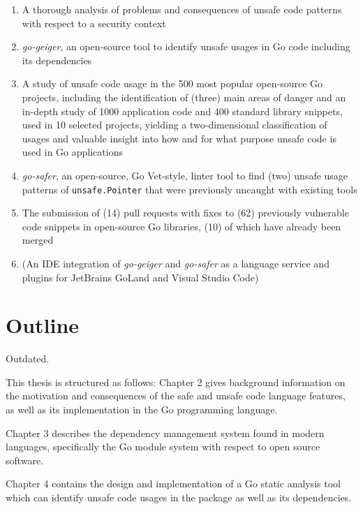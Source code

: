 \begin{enumerate}
    \item A thorough analysis of problems and consequences of unsafe code patterns with respect to a security context
    \item \textit{go-geiger}, an open-source tool to identify unsafe usages in Go code including its dependencies
    \item A study of unsafe code usage in the 500 most popular open-source Go projects, including the identification
    of (three) main areas of danger and an in-depth study of 1000 application code and 400 standard library snippets,
    used in 10 selected projects, yielding a two-dimensional classification of usages and valuable insight into how and
    for what purpose unsafe code is used in Go applications
    \item \textit{go-safer}, an open-source, Go Vet-style, linter tool to find (two) unsafe usage patterns of \texttt{unsafe.Pointer}
    that were previously uncaught with existing tools
    \item The submission of (14) pull requests with fixes to (62) previously vulnerable code snippets in open-source Go
    libraries, (10) of which have already been merged
    \item (An IDE integration of \textit{go-geiger} and \textit{go-safer} as a language service and plugins for
    JetBrains GoLand and Visual Studio Code)
\end{enumerate}



\section{Outline}\label{sec:outline}

Outdated.

This thesis is structured as follows: Chapter 2 gives background information on the motivation
and consequences of the safe and unsafe code language features, as well as its implementation
in the Go programming language.

Chapter 3 describes the dependency management system found in modern languages, specifically
the Go module system with respect to open source software.

Chapter 4 contains the design and implementation of a Go static analysis tool which can identify
unsafe code usages in the package as well as its dependencies.

